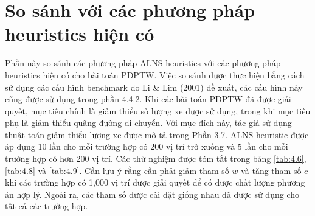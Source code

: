 \section{So sánh với các phương pháp heuristics hiện có}
Phần này so sánh các phương pháp ALNS heuristics với các phương pháp heuristics hiện có cho bài toán PDPTW. Việc so sánh được thực hiện bằng cách sử dụng các cấu hình benchmark do Li \& Lim (2001) đề xuất, các cấu hình này cũng được sử dụng trong phần 4.4.2. Khi các bài toán PDPTW đã được giải quyết, mục tiêu chính là giảm thiểu số lượng xe được sử dụng, trong khi mục tiêu phụ là giảm thiểu quãng đường di chuyển. Với mục đích này, tác giả sử dụng thuật toán giảm thiểu lượng xe được mô tả trong Phần 3.7. ALNS heuristic được áp dụng 10 lần cho mỗi trường hợp có 200 vị trí trở xuống và 5 lần cho mỗi trường hợp có hơn 200 vị trí. Các thử nghiệm được tóm tắt trong bảng \ref{tab:4.6}, \ref{tab:4.8} và \ref{tab:4.9}. Cần lưu ý rằng cần phải giảm tham số $w$ và tăng tham số $c$ khi các trường hợp có 1,000 vị trí được giải quyết để có được chất lượng phương án hợp lý. Ngoài ra, các tham số được cài đặt giống nhau đã được sử dụng cho tất cả các trường hợp.


